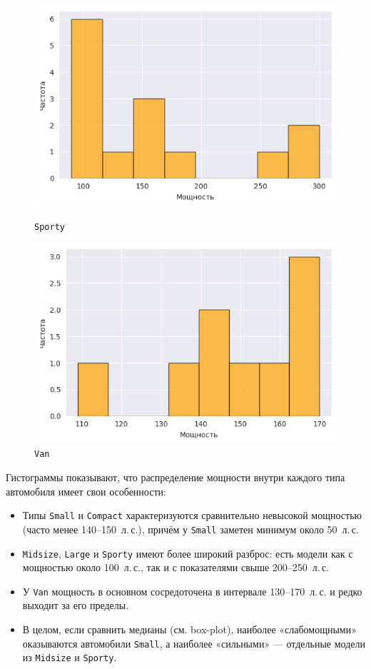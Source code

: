 \documentclass[a4paper,12pt]{article}
\begin{document}
\begin{figure}[H]
    \begin{minipage}{0.45\textwidth}
        \centering
        \includegraphics[width=\textwidth]{images/hist_sporty.png}
        \caption{\texttt{Sporty}}
    \end{minipage}
    \quad
    \begin{minipage}{0.45\textwidth}
        \centering
        \includegraphics[width=\textwidth]{images/hist_van.png}
        \caption{\texttt{Van}}
    \end{minipage}
\end{figure}
Гистограммы показывают, что распределение мощности внутри каждого типа автомобиля имеет свои особенности:
\begin{itemize}
    \item Типы \texttt{Small} и \texttt{Compact} характеризуются сравнительно невысокой мощностью (часто менее 140--150~л.\,с.), причём у \texttt{Small} заметен минимум около 50~л.\,с.
    \item \texttt{Midsize}, \texttt{Large} и \texttt{Sporty} имеют более широкий разброс: есть модели как с мощностью около 100~л.\,с., так и с показателями свыше 200--250~л.\,с.
    \item У \texttt{Van} мощность в основном сосредоточена в интервале 130--170~л.\,с. и редко выходит за его пределы.
    \item В целом, если сравнить медианы (см. box-plot), наиболее «слабомощными» оказываются автомобили \texttt{Small}, а наиболее «сильными» --- отдельные модели из \texttt{Midsize} и \texttt{Sporty}.
\end{itemize}
\end{document}
